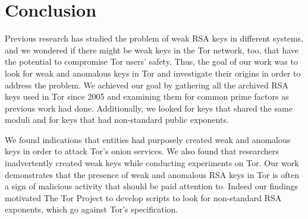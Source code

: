 \section{Conclusion}
\label{sec:conclusion}

Previous research has studied the problem of weak RSA keys in different
systems, and we wondered if there might be weak keys in the Tor
network, too, that have the potential to compromise Tor users' safety.
Thus, the goal of our work was to look for weak and anomalous keys in Tor
and investigate their origins in order to address the problem.  We
achieved our goal by gathering all the archived RSA keys used in Tor since
2005 and examining them for common prime factors as previous work had done.
Additionally, we looked for keys that shared the same moduli and
for keys that had non-standard public exponents.

We found indications that entities had purposely created weak and anomalous keys
in order to attack Tor's onion services.  We also found that researchers
inadvertently created weak keys while conducting experiments on Tor.
Our work demonstrates that the presence of weak and anomalous RSA keys in Tor is
often a sign of malicious activity that should be paid attention to.
Indeed our findings motivated The Tor Project to develop scripts to look for
non-standard RSA exponents, which go against Tor's specification.
